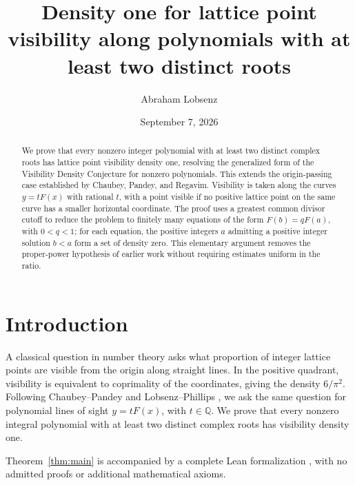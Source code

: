 \documentclass[10pt]{amsart}
\title[Polynomial visibility has density one]{Density one for lattice point visibility along polynomials with at least two distinct roots}
\author{Abraham Lobsenz}
\date{September 7, 2026}
\theoremstyle{remark}
\newcommand{\Q}{\mathbb{Q}}
\begin{document}
\begin{abstract}
We prove that every nonzero integer polynomial with at least two distinct
complex roots has lattice point visibility density one, resolving the
generalized form of the Visibility Density Conjecture for nonzero polynomials.
This extends the origin-passing case established by Chaubey, Pandey, and Regavim. Visibility is taken along the curves
$y=tF(x)$ with rational $t$, with a point visible if no positive lattice
point on the same curve has a smaller horizontal coordinate. The proof uses a greatest common divisor cutoff to reduce the problem to
finitely many equations of the form $F(b)=qF(a)$, with $0<q<1$;
for each equation, the positive integers $a$ admitting a positive integer
solution $b<a$ form a set of density zero. This
elementary argument removes the proper-power hypothesis of earlier work
without requiring estimates uniform in the ratio.
\end{abstract}

\maketitle

\section{Introduction}\label{sec:intro}
A classical question in number theory asks what proportion of integer lattice
points are visible from the origin along straight lines. In the positive
quadrant, visibility is equivalent to coprimality of the coordinates, giving
the density $6/\pi^2$. Following Chaubey--Pandey \cite{CP} and
Lobsenz--Phillips \cite{LP}, we ask the same question for polynomial lines
of sight $y=tF(x)$, with $t\in\Q$. We prove that every nonzero integral
polynomial with at least two distinct complex roots has visibility density one.

Theorem~\ref{thm:main} is accompanied by a complete Lean formalization
\cite{Lean}, with no admitted proofs or additional mathematical axioms.
\end{document}
